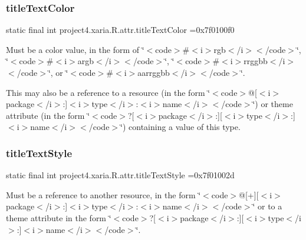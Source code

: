 \subsubsection{\texorpdfstring{title\+Text\+Color}{titleTextColor}}
{\footnotesize\ttfamily static final int project4.\+xaria.\+R.\+attr.\+title\+Text\+Color =0x7f0100f0\hspace{0.3cm}{\ttfamily [static]}}

Must be a color value, in the form of \char`\"{}$<$code$>$\#$<$i$>$rgb$<$/i$>$$<$/code$>$\char`\"{}, \char`\"{}$<$code$>$\#$<$i$>$argb$<$/i$>$$<$/code$>$\char`\"{}, \char`\"{}$<$code$>$\#$<$i$>$rrggbb$<$/i$>$$<$/code$>$\char`\"{}, or \char`\"{}$<$code$>$\#$<$i$>$aarrggbb$<$/i$>$$<$/code$>$\char`\"{}. 

This may also be a reference to a resource (in the form \char`\"{}$<$code$>$@\mbox{[}$<$i$>$package$<$/i$>$\+:\mbox{]}$<$i$>$type$<$/i$>$\+:$<$i$>$name$<$/i$>$$<$/code$>$\char`\"{}) or theme attribute (in the form \char`\"{}$<$code$>$?\mbox{[}$<$i$>$package$<$/i$>$\+:\mbox{]}\mbox{[}$<$i$>$type$<$/i$>$\+:\mbox{]}$<$i$>$name$<$/i$>$$<$/code$>$\char`\"{}) containing a value of this type. \mbox{\label{classproject4_1_1xaria_1_1R_1_1attr_a053417a8f9179bec664e1a5fe77b9759}} 
\subsubsection{\texorpdfstring{title\+Text\+Style}{titleTextStyle}}
{\footnotesize\ttfamily static final int project4.\+xaria.\+R.\+attr.\+title\+Text\+Style =0x7f01002d\hspace{0.3cm}{\ttfamily [static]}}

Must be a reference to another resource, in the form \char`\"{}$<$code$>$@\mbox{[}+\mbox{]}\mbox{[}$<$i$>$package$<$/i$>$\+:\mbox{]}$<$i$>$type$<$/i$>$\+:$<$i$>$name$<$/i$>$$<$/code$>$\char`\"{} or to a theme attribute in the form \char`\"{}$<$code$>$?\mbox{[}$<$i$>$package$<$/i$>$\+:\mbox{]}\mbox{[}$<$i$>$type$<$/i$>$\+:\mbox{]}$<$i$>$name$<$/i$>$$<$/code$>$\char`\"{}. \mbox{\label{classproject4_1_1xaria_1_1R_1_1attr_a8b8afb34277b3685f25daffebf6ab3ee}} 
